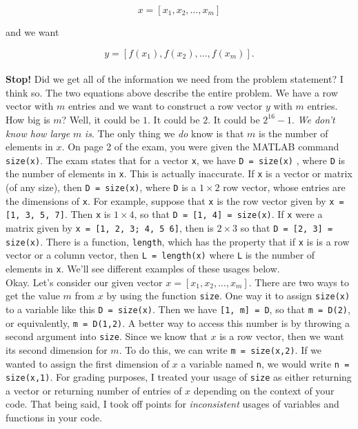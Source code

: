 \documentclass{article}
\begin{document}
\[
x = [x_1, x_2, \dots, x_m]
\]

{\setlength{\parindent}{0cm}
and we want}

\[
y = [f(x_1), f(x_2), \dots, f(x_m)].
\] \\

\textbf{Stop!} Did we get all of the information we need from the problem statement? I think so. The two equations above describe the entire problem. We have a row vector with $m$ entries and we want to construct a row vector $y$ with $m$ entries. \\ 

How big is $m$? Well, it could be $1$. It could be $2$. It could be $2^{16}-1$. \textit{We don't know how large} $m$ \textit{is}. The only thing we \textit{do} know is that $m$ is the number of elements in $x$. On page 2 of the exam, you were given the MATLAB command \texttt{size(x)}. The exam states that for a vector \texttt{x}, we have \texttt{D = size(x)} , where \texttt{D} is the number of elements in \texttt{x}. This is actually inaccurate. If \texttt{x} is a vector or matrix (of any size), then \texttt{D = size(x)}, where \texttt{D} is a $1 \times 2$ row vector, whose entries are the dimensions of \texttt{x}. For example, suppose that \texttt{x} is the row vector given by \texttt{x = [1, 3, 5, 7]}. Then \texttt{x} is $1 \times 4$, so that \texttt{D = [1, 4] = size(x)}. If \texttt{x} were a matrix given by \texttt{x = [1, 2, 3; 4, 5 6]}, then  is $2 \times 3$ so that \texttt{D = [2, 3] = size(x)}. There is a function, \texttt{length}, which has the property that if \texttt{x} is is a row vector or a column vector, then \texttt{L = length(x)} where \texttt{L} is the number of elements in \texttt{x}. We'll see different examples of these usages below. \\

 Okay. Let's consider our given vector $x = [x_1, x_2, \dots, x_m]$. There are two ways to get the value $m$ from $x$ by using the function \texttt{size}. One way it to assign \texttt{size(x)} to a variable like this \texttt{D = size(x)}. Then we have \texttt{[1, m] = D}, so that \texttt{m = D(2)}, or equivalently, \texttt{m = D(1,2)}. A better way to access this number is by throwing a second argument into \texttt{size}. Since we know that $x$ is a row vector, then we want its second dimension for $m$. To do this, we can write \texttt{m = size(x,2)}. If we wanted to assign the first dimension of $x$ a variable named \texttt{n}, we would write \texttt{n = size(x,1)}. For grading purposes, I treated your usage of \texttt{size} as either returning a vector or returning number of entries of $x$ depending on the context of your code. That being said, I took off points for \emph{inconsistent} usages of variables and functions in your code.\\
\end{document}
